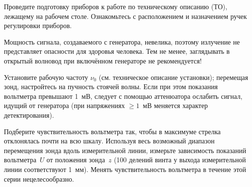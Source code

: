 \begin{lab:task}
    
    
    
    \item Проведите подготовку приборов к работе по техническому описанию (ТО),
    лежащему на рабочем столе. Ознакомьтесь с расположением и назначением
    ручек регулировки приборов.
    
\begin{lab:warning}
Мощность сигнала, создаваемого с генератора, невелика, поэтому
    излучение не представляет опасности для здоровья человека. Тем не менее,
    заглядывать в открытый волновод при включённом генераторе не рекомендуется!
\end{lab:warning}
    
    
    
    
    \item Установите рабочую частоту $\nu_0$ (см. техническое описание установки); 
    перемещая зонд, настройтесь на пучность стоячей волны. 
    Если при этом показания вольтметра превышают 1~мВ, 
    следует с помощью аттенюатора ослабить сигнал, идущий от генератора  (при
    напряжениях $\ge1$~мВ меняется характер детектирования).
    
    \item Подберите чувствительность вольтметра так,
    чтобы в максимуме стрелка отклонялась почти на всю шкалу. Используя весь
    возможный диапазон перемещения зонда вдоль измерительной линии, измерьте
    зависимость показаний вольтметра~$U$ от положения зонда~$z$ (100 делений винта
    у выхода измерительной линии соответствуют 1~мм). Менять чувствительность
    вольтметра в течение этой серии нецелесообразно.
    

\end{lab:task}
